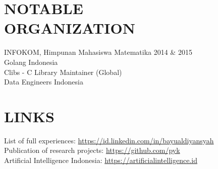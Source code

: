 \documentclass[margin, 10pt]{res} %
\begin{document}
\begin{resume}
\section{NOTABLE\\ORGANIZATION} 

INFOKOM, Himpunan Mahasiswa Matematika 2014 \& 2015\\
Golang Indonesia\\
Clibs - C Library Maintainer (Global)\\
Data Engineers Indonesia



\section{LINKS} 
List of full experiences: \url{https://id.linkedin.com/in/bayualdiyansyah}\\
Publication of research projects: \url{https://github.com/pyk}\\
Artificial Intelligence Indonesia: \url{https://artificialintelligence.id}


\end{resume}
\end{document}
